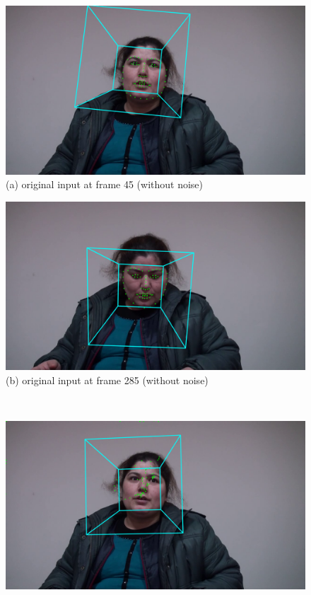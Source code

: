 \begin{figure}[htb]
    \centering
    \small
    \begin{minipage}[c]{0.42\linewidth}
    \centering
    \includegraphics[width=\textwidth]{images/facial/frame_45_face_0.png} \\
    (a) original input at frame 45 (without noise)
    \end{minipage}
    \begin{minipage}[c]{0.42\linewidth}
    \centering
    \includegraphics[width=\textwidth]{images/facial/frame_285_face_0.png} \\
    (b) original input at frame 285 (without noise)
    \end{minipage}
    \\
    \begin{minipage}[c]{0.42\linewidth}
    \centering
    \includegraphics[width=\textwidth]{images/facial/recons_45_face_0_multiDDAE_mfcc.png} \\

\end{minipage}
\end{figure}
